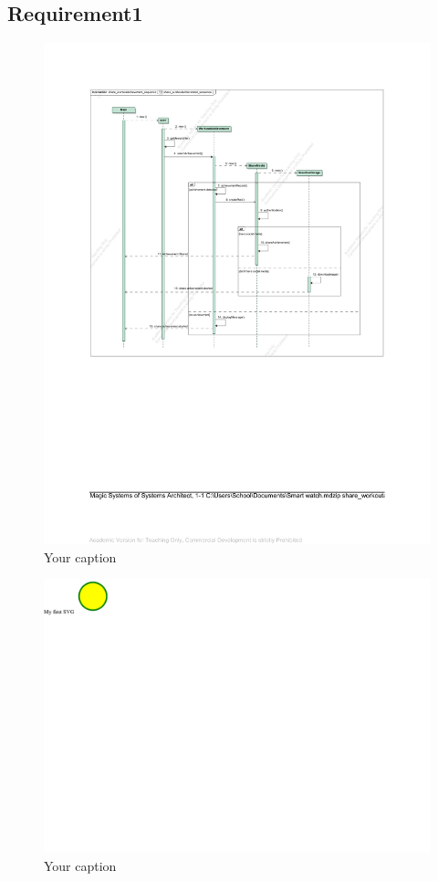\documentclass{article}
\begin{document}
	\subsection{Requirement1}
		\begin{figure}[h!]
		    \centering
		    \captionsetup{labelformat=empty}
		    \caption{Your caption}
		    \includegraphics[width=\textwidth, angle=0]{Howard/share_workout/share_workout_sequence.pdf}
		\end{figure}
		\newpage
		\begin{figure}[h!]
		    \centering
		    \captionsetup{labelformat=empty}
		    \caption{Your caption}
		    \includegraphics[width=\textwidth, angle=0]{Kreis2.pdf}
		\end{figure}
		\newpage
\end{document}
